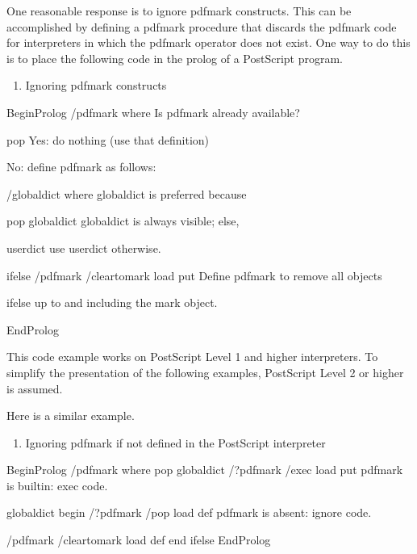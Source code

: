 \documentclass[letterpaper,12pt,english,openany,oneside]{sphinxmanual}
\begin{document}
One reasonable response is to ignore pdfmark constructs. This can be accomplished by defining a pdfmark procedure that discards the pdfmark code for interpreters in which the pdfmark operator does not exist. One way to do this is to place the following code in the prolog of a PostScript program.
\begin{enumerate}
%
\item {} 
Ignoring pdfmark constructs

\end{enumerate}

\begin{sphinxVerbatim}[commandchars=\\\{\}]
 \PYGZpc{}\PYGZpc{}BeginProlog
  /pdfmark where
\PYGZpc{} Is pdfmark already available?

      \PYGZob{} pop \PYGZcb{}
\PYGZpc{} Yes: do nothing (use that definition)

      \PYGZob{}
\PYGZpc{} No: define pdfmark as follows:

      /globaldict where
\PYGZpc{} globaldict is preferred because

          \PYGZob{} pop globaldict \PYGZcb{}
\PYGZpc{} globaldict is always visible; else,

          \PYGZob{} userdict \PYGZcb{}
\PYGZpc{} use userdict otherwise.

      ifelse
      /pdfmark /cleartomark load put
      \PYGZcb{}
\PYGZpc{} Define pdfmark to remove all objects

  ifelse
\PYGZpc{} up to and including the mark object.

  \PYGZpc{}\PYGZpc{}EndProlog
\end{sphinxVerbatim}

This code example works on PostScript Level 1 and higher interpreters. To simplify the presentation of the following examples, PostScript Level 2 or higher is assumed.

Here is a similar example.
\begin{enumerate}
%
\item {} 
Ignoring pdfmark if not defined in the PostScript interpreter

\end{enumerate}

\begin{sphinxVerbatim}[commandchars=\\\{\}]
\PYGZpc{}\PYGZpc{}BeginProlog
/pdfmark where
  \PYGZob{} pop globaldict /?pdfmark /exec load put \PYGZcb{}
\PYGZpc{} pdfmark is built\PYGZhy{}in: exec code.

  \PYGZob{}
  globaldict
      begin
      /?pdfmark /pop load def
\PYGZpc{} pdfmark is absent: ignore code.

      /pdfmark /cleartomark load def
      end
  \PYGZcb{}
ifelse
\PYGZpc{}\PYGZpc{}EndProlog
\end{sphinxVerbatim}
\end{document}
